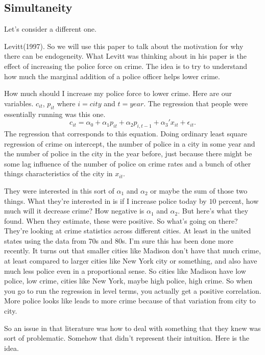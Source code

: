 \documentclass[11pt,a4paper]{amsart}
\theoremstyle{plain}
\theoremstyle{definition}
\begin{document}
\subsection{Simultaneity} 
 		 Let's consider a different one.\par 
 		 Levitt(1997). So we will use this paper to talk about the motivation for why there can be endogeneity.  What Levitt was thinking about in his paper is the effect of increasing the police force on crime. The idea is to try to understand how much the marginal addition of a police officer helps lower crime.\par 
 		 How much should I increase my police force to lower crime. Here are our variables. $c_{it}$, $p_{it}$ where $i = city$ and $t = year$. The regression that people were essentially running was this one. 
 		 \[	c_{it} = \alpha_{0} + \alpha_{1}p_{it} + \alpha_{2}p_{i,t-1} + \alpha_{3}'x_{it} + \epsilon_{it}.	\]
 		 The regression that corresponds to this equation. Doing ordinary least square regression of crime on intercept, the number of police in a city in some year and the number of police in the city in the year before, just because there might be some lag influence of the number of police on crime rates and a bunch of other things characteristics of the city in $x_{it}$.\par 
 		 They were interested in this sort of $\alpha_{1}$ and $\alpha_{2}$ or maybe the sum of those two things. What they're interested in is if I increase police today by $10$ percent, how much will it decrease crime? How negative is $\alpha_{1}$ and $\alpha_{2}$. But here's what they found. When they estimate, these were positive. So what's going on there? They're looking at crime statistics across different cities. At least in the united states using the data from 70s and 80s. I'm sure this has been done more recently. It turns out that smaller cities like Madison don't have that much crime, at least compared to larger cities like New York city or something, and also have much less police even in a proportional sense. So cities like Madison have low police, low crime, cities like New York, maybe high police, high crime. So when you go to run the regression in level terms, you actually get a positive correlation. More police looks like leads to more crime because of that variation from city to city.\par 
 		 So an issue in that literature was how to deal with something that they knew was sort of problematic. Somehow that didn't represent their intuition. Here is the idea.\par 
\end{document}
